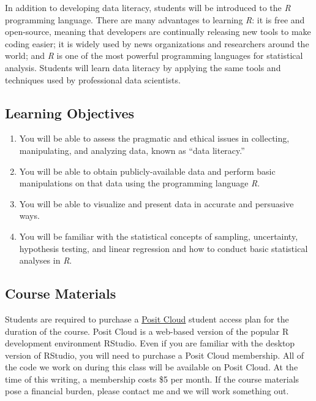 \documentclass[12pt,letterpaper]{article}
\begin{document}
In addition to developing data literacy, students will be introduced to the \textit{R} programming language. There are many advantages to learning \textit{R}: it is free and open-source, meaning that developers are continually releasing new tools to make coding easier; it is widely used by news organizations and researchers around the world; and \textit{R} is one of the most powerful programming languages for statistical analysis. Students will learn data literacy by applying the same tools and techniques used by professional data scientists.

\subsection*{Learning Objectives}

\begin{enumerate}
    \item You will be able to assess the pragmatic and ethical issues in collecting, manipulating, and analyzing data, known as ``data literacy.''
    \item You will be able to obtain publicly-available data and perform basic manipulations on that data using the programming language \textit{R}.
    \item You will be able to visualize and present data in accurate and persuasive ways.
    \item You will be familiar with the statistical concepts of sampling, uncertainty, hypothesis testing, and linear regression and how to conduct basic statistical analyses in \textit{R}.
\end{enumerate}
\vspace{-.5em}

\subsection*{Course Materials}

Students are required to purchase a \href{https://posit.cloud/}{Posit Cloud} student access plan for the duration of the course. Posit Cloud is a web-based version of the popular R development environment RStudio. Even if you are familiar with the desktop version of RStudio, you will need to purchase a Posit Cloud membership. All of the code we work on during this class will be available on Posit Cloud. At the time of this writing, a membership costs \$5 per month. If the course materials pose a financial burden, please contact me and we will work something out.
\end{document}
